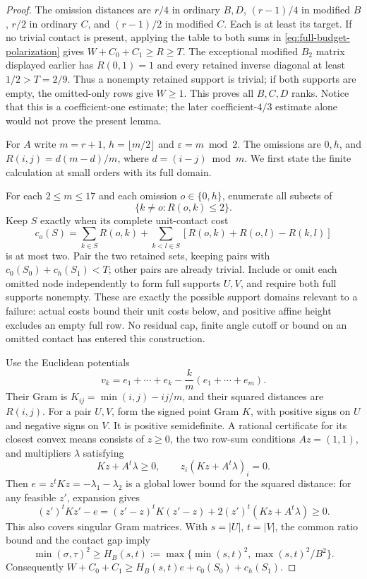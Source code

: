 \documentclass[11pt]{article}
\theoremstyle{remark}\newtheorem{remark}[theorem]{Remark}
\begin{document}
\begin{proof}
The omission distances are $r/4$ in ordinary $B,D$, $(r-1)/4$ in
modified $B$, $r/2$ in ordinary $C$, and $(r-1)/2$ in modified $C$.
Each is at least its target. If no trivial contact is present, applying
the table to both sums in \eqref{eq:full-budget-polarization} gives
$W+C_0+C_1\ge R\ge T$. The exceptional modified $B_2$ matrix
displayed earlier has $R(0,1)=1$ and every retained inverse diagonal
at least $1/2>T=2/9$. Thus a nonempty retained support is trivial;
if both supports are empty, the omitted-only rows give $W\ge1$.
This proves all $B,C,D$ ranks. Notice that this is a coefficient-one
estimate; the later coefficient-$4/3$ estimate alone would not prove
the present lemma.

For $A$ write $m=r+1$, $h=\lfloor m/2\rfloor$ and
$\varepsilon=m\bmod2$. The omissions are $0,h$, and
$R(i,j)=d(m-d)/m$, where $d=(i-j)\bmod m$. We first state the
finite calculation at small orders with its full domain.

For each $2\le m\le17$ and each omission $o\in\{0,h\}$,
enumerate all subsets of
\[
 \{k\ne o:R(o,k)\le2\}.
\]
Keep $S$ exactly when its complete unit-contact cost
\[
 c_o(S)=\sum_{k\in S}R(o,k)+
   \sum_{k<l\in S}[R(o,k)+R(o,l)-R(k,l)]
\]
is at most two. Pair the two retained sets, keeping pairs with
$c_0(S_0)+c_h(S_1)<T$; other pairs are already trivial. Include
or omit each omitted node independently to form full supports $U,V$,
and require both full supports nonempty. These are exactly the possible
support domains relevant to a failure: actual costs bound their unit
costs below, and positive affine height excludes an empty full row.
No residual cap, finite angle cutoff or bound on an omitted contact
has entered this construction.

Use the Euclidean potentials
\[
 v_k=e_1+\cdots+e_k-\frac{k}{m}(e_1+\cdots+e_m).
\]
Their Gram is $K_{ij}=\min(i,j)-ij/m$, and their squared distances
are $R(i,j)$. For a pair $U,V$, form the signed point Gram $K$,
with positive signs on $U$ and negative signs on $V$. It is positive
semidefinite. A rational certificate for its closest convex means
consists of $z\ge0$, the two row-sum conditions $Az=(1,1)$,
and multipliers $\lambda$ satisfying
\[
 Kz+A^t\lambda\ge0,\qquad
 z_i(Kz+A^t\lambda)_i=0.
\]
Then $e=z^tKz=-\lambda_1-\lambda_2$ is a global lower bound for
the squared distance: for any feasible $z'$, expansion gives
\[
 (z')^tKz'-e=(z'-z)^tK(z'-z)
             +2(z')^t(Kz+A^t\lambda)\ge0.
\]
This also covers singular Gram matrices. With $s=|U|$, $t=|V|$,
the common ratio bound and the contact gap imply
\[
 \min(\sigma,\tau)^2\ge
 H_B(s,t):=\max\{\min(s,t)^2,\max(s,t)^2/B^2\}.
\]
Consequently $W+C_0+C_1\ge H_B(s,t)e+c_0(S_0)+c_h(S_1)$.


\end{proof}
\end{document}
